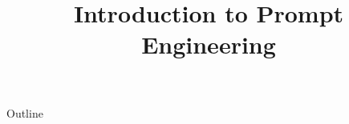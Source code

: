 \documentclass[xcolor=dvipsnames,compress,t,pdf,9pt]{beamer}
\title[\insertframenumber /\inserttotalframenumber]{Introduction to Prompt Engineering}
\begin{document}
	\begin{frame}
	\titlepage
	\end{frame}
	
	\begin{frame}{Outline}
	    \tableofcontents
	\end{frame}

	
	
\end{document}
